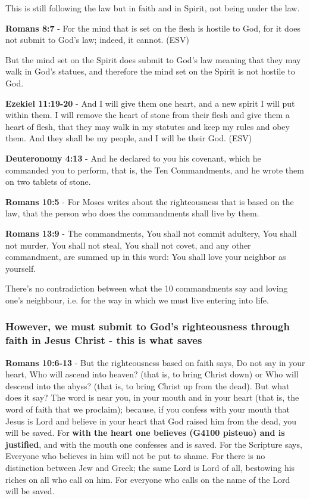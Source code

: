 \documentclass[11pt]{article}
\begin{document}
This is still following the law but in faith and in Spirit, not being under the law.

\textbf{Romans 8:7} - For the mind that is set on the flesh is hostile to God, for it does not submit to God's law; indeed, it cannot. (ESV)

But the mind set on the Spirit does submit to God's law meaning that they may walk in God's statues, and therefore the mind set on the Spirit is not hostile to God.

\textbf{Ezekiel 11:19-20} - And I will give them one heart, and a new spirit I will put within them. I will remove the heart of stone from their flesh and give them a heart of flesh, that they may walk in my statutes and keep my rules and obey them. And they shall be my people, and I will be their God. (ESV)

\textbf{Deuteronomy 4:13} - And he declared to you his covenant, which he commanded you to perform, that is, the Ten Commandments, and he wrote them on two tablets of stone.

\textbf{Romans 10:5} - For Moses writes about the righteousness that is based on the law, that the person who does the commandments shall live by them.

\textbf{Romans 13:9} - The commandments, You shall not commit adultery, You shall not murder, You shall not steal, You shall not covet, and any other commandment, are summed up in this word: You shall love your neighbor as yourself.

There's no contradiction between what the 10 commandments say and loving one's neighbour, i.e. for the way in which we must live entering into life.

\subsubsection{However, we must submit to God's righteousness through faith in Jesus Christ - this is what saves}
\label{sec:org1565013}
\textbf{Romans 10:6-13} - But the righteousness based on faith says, Do not say in your heart, Who will ascend into heaven? (that is, to bring Christ down) or Who will descend into the abyss? (that is, to bring Christ up from the dead).  But what does it say? The word is near you, in your mouth and in your heart (that is, the word of faith that we proclaim); because, if you confess with your mouth that Jesus is Lord and believe in your heart that God raised him from the dead, you will be saved.  For \textbf{with the heart one believes (G4100 pisteuo) and is justified}, and with the mouth one confesses and is saved.  For the Scripture says, Everyone who believes in him will not be put to shame.  For there is no distinction between Jew and Greek; the same Lord is Lord of all, bestowing his riches on all who call on him.  For everyone who calls on the name of the Lord will be saved.
\end{document}

